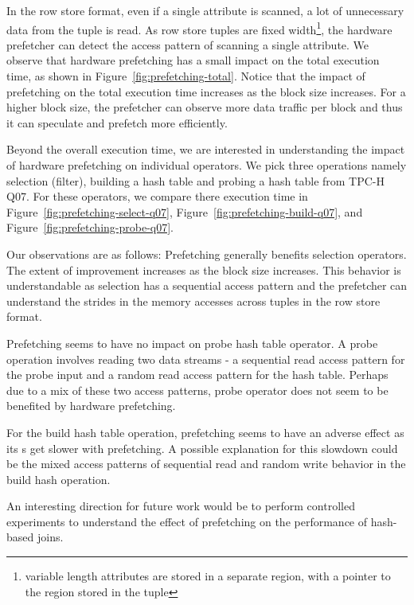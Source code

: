 In the row store format, even if a single attribute is scanned, a lot of unnecessary data from the tuple is read.
As row store tuples are fixed width\footnote{variable length attributes are stored in a separate region, with a pointer to the region stored in the tuple}, the hardware prefetcher can detect the access pattern of scanning a single attribute. 
We observe that hardware prefetching has a small impact on the total execution time, as shown in Figure~\ref{fig:prefetching-total}. 
Notice that the impact of prefetching on the total execution time increases as the block size increases. 
For a higher block size, the prefetcher can observe more data traffic per block and thus it can speculate and prefetch more efficiently. 

Beyond the overall execution time, we are interested in understanding the impact of hardware prefetching on individual operators. 
We pick three operations namely selection (filter), building a hash table and probing a hash table from TPC-H Q07.
For these operators, we compare there execution time in Figure~\ref{fig:prefetching-select-q07}, Figure~\ref{fig:prefetching-build-q07}, and Figure~\ref{fig:prefetching-probe-q07}.

Our observations are as follows:
Prefetching generally benefits selection operators. 
The extent of improvement increases as the block size increases. 
This behavior is understandable as selection has a sequential access pattern and the prefetcher can understand the strides in the memory accesses across tuples in the row store format.

Prefetching seems to have no impact on probe hash table operator.
A probe operation involves reading two data streams - a sequential read access pattern for the probe input and a random read access pattern for the hash table. 
Perhaps due to a mix of these two access patterns, probe operator does not seem to be benefited by hardware prefetching. 

For the build hash table operation, prefetching seems to have an adverse effect as its \wo{}s get slower with prefetching.
A possible explanation for this slowdown could be the mixed access patterns of sequential read and random write behavior in the build hash operation.

An interesting direction for future work would be to perform controlled experiments to understand the effect 
of prefetching on the performance of hash-based joins.

